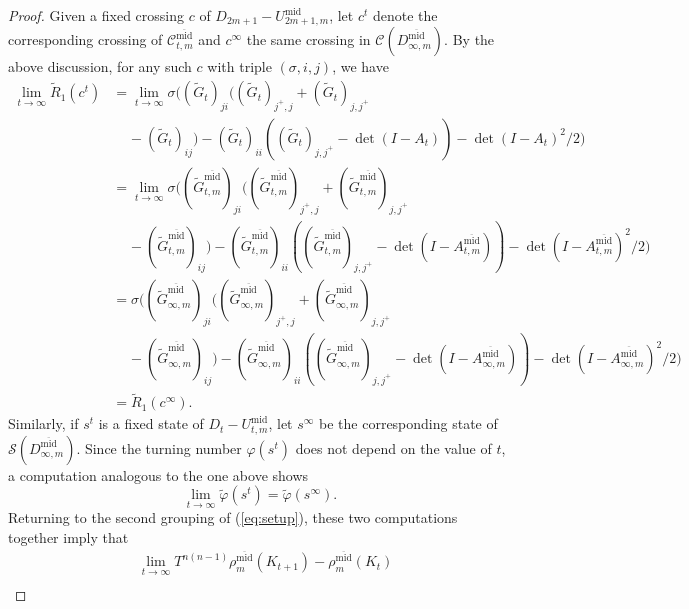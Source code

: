 \documentclass[11pt,hyp,]{nyjm}
\numberwithin{thm}{section}
\theoremstyle{definition}
\theoremstyle{remark}
\begin{document}
\begin{proof}
		Given a fixed crossing $c$ of $D_{2m + 1} - U^\text{mid}_{2m + 1,m}$, let $c^t$ denote the corresponding crossing of $\mathcal{C}^{\overline{\text{mid}}}_{t,m}$ and $c^\infty$ the same crossing in $\mathcal{C}(D^{\overline{\text{mid}}}_{\infty,m})$. By the above discussion, for any such $c$ with triple $(\sigma, i,j)$, we have
		\begin{align*}
		\lim_{t \to \infty} \widetilde{R}_1(c^t) &= \lim_{t \to \infty}\sigma((\widetilde{G}_t)_{ji}((\widetilde{G}_t)_{j^+, j} + (\widetilde{G}_t)_{j, j^+} \\
		& \ \ \ \ \ - (\widetilde{G}_t)_{ij}) - (\widetilde{G}_t)_{ii}((\widetilde{G}_t)_{j,j^+} - \det(I - A_t)) - \det(I - A_t)^2/2) \\
		&= \lim_{t \to \infty}\sigma((\widetilde{G}^{\overline{\text{mid}}}_{t,m})_{ji}((\widetilde{G}^{\overline{\text{mid}}}_{t,m})_{j^+, j} + (\widetilde{G}^{\overline{\text{mid}}}_{t,m})_{j, j^+} \\
		& \ \ \ \ \ - (\widetilde{G}^{\overline{\text{mid}}}_{t,m})_{ij}) - (\widetilde{G}^{\overline{\text{mid}}}_{t,m})_{ii}((\widetilde{G}^{\overline{\text{mid}}}_{t,m})_{j,j^+} - \det(I - A^{\overline{\text{mid}}}_{t,m})) - \det(I - A^{\overline{\text{mid}}}_{t,m})^2/2) \\
		&= \sigma((\widetilde{G}^{\overline{\text{mid}}}_{\infty,m})_{ji}((\widetilde{G}^{\overline{\text{mid}}}_{\infty,m})_{j^+, j} + (\widetilde{G}^{\overline{\text{mid}}}_{\infty,m})_{j, j^+} \\
		& \ \ \ \ \ - (\widetilde{G}^{\overline{\text{mid}}}_{\infty,m})_{ij}) - (\widetilde{G}^{\overline{\text{mid}}}_{\infty,m})_{ii}((\widetilde{G}^{\overline{\text{mid}}}_{\infty,m})_{j,j^+} - \det(I - A^{\overline{\text{mid}}}_{\infty,m})) - \det(I - A^{\overline{\text{mid}}}_{\infty,m})^2/2) \\
		&= \tilde{R}_1(c^\infty).
		\end{align*}
		Similarly, if $s^t$ is a fixed state of $D_t - U^\text{mid}_{t,m}$, let $s^\infty$ be the corresponding state of $\mathcal{S}(D^{\overline{\text{mid}}}_{\infty,m})$. Since the turning number $\varphi(s^t)$ does not depend on the value of $t$, a computation analogous to the one above shows
		$$
		\lim_{t \to \infty} \tilde{\varphi}(s^t) = \tilde{\varphi}(s^\infty).
		$$
		Returning to the second grouping of (\ref{eq:setup}), these two computations together imply that
		\begin{align*}
		&\lim_{t \to \infty} T^{n(n - 1)} \rho^{\overline{\text{mid}}}_m(K_{t + 1}) -  \rho^{\overline{\text{mid}}}_m(K_t) \\

\end{align*}
\end{proof}
\end{document}
